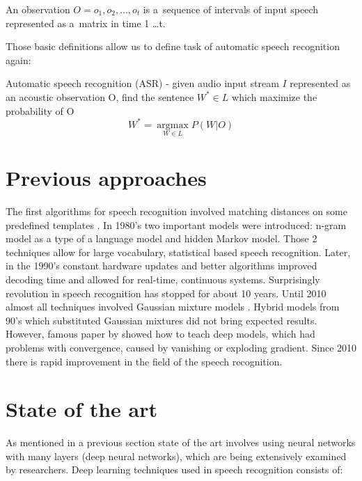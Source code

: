 \begin{definition}
	An observation $O = o_1,o_2,\dots,o_t$ is a~sequence of intervals of input speech represented as a~matrix in time 1 \dots  t.
\end{definition}

Those basic definitions allow us to define task of automatic speech recognition again: 

\begin{definition}
	Automatic speech recognition (ASR) - given audio input stream $I$ represented as an acoustic observation O, find the sentence $W^* \in L$ which maximize the probability of O
\begin{equation} 
W^*=\underset{W \in L}{\operatorname{argmax}} P(W|O)
\end{equation}

\end{definition}

\section{Previous approaches}
The first algorithms for speech recognition involved matching distances on some predefined templates \parencite{juang_automatic_2005}. In 1980's two important models were introduced: n-gram model as a type of a language model and hidden Markov model. Those 2 techniques allow for large vocabulary, statistical based speech recognition. Later, in the 1990's constant hardware updates and better algorithms improved decoding time and allowed for real-time, continuous systems. Surprisingly revolution in speech recognition has stopped for about 10 years. Until 2010 almost all techniques involved Gaussian mixture models \parencite{yu_automatic_2015}. Hybrid models from 90's which substituted Gaussian mixtures did not bring expected results. However, famous paper by \textcite{hinton_fast_2006} showed how to teach deep models, which had problems with convergence, caused by vanishing or exploding gradient. Since 2010 there is rapid improvement in the field of the speech recognition.

\section{State of the art}
As mentioned in a previous section state of the art involves using neural networks with many layers (deep neural networks), which are being extensively examined by researchers. Deep learning techniques used in speech recognition consists of:

